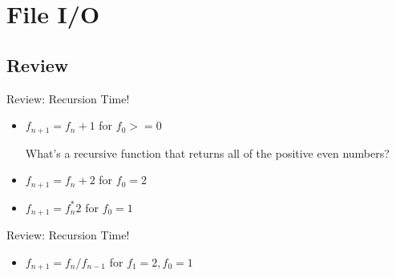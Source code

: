 \section{File I/O}
\subsection{Review}
\begin{frame}[fragile]{Review: Recursion Time!}
\begin{semiverbatim}\end{semiverbatim}	
	\pause
\begin{itemize}
\item $f_{n+1} = f_n + 1$ for $f_0 >= 0$
\begin{center}What's a recursive function that returns all of the positive even numbers?\end{center} \pause
\item $f_{n+1} = f_n + 2$ for $f_0 = 2$
\end{itemize}
\begin{semiverbatim}\end{semiverbatim}		\pause
\begin{itemize}
\item $f_{n+1} = f_n ^* 2$ for $f_0 = 1$
\end{itemize}
\end{frame}
\begin{frame}[fragile]{Review: Recursion Time!}
\begin{semiverbatim}\end{semiverbatim}		\pause
\begin{itemize}
\item $f_{n+1} = f_n / f_{n - 1}$ for $f_1 = 2, f_0 = 1$
\end{itemize}
\end{frame}


